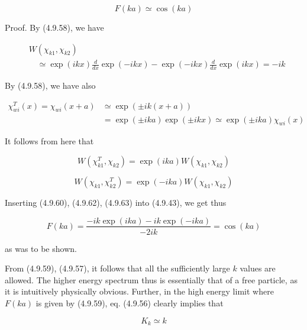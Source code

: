 \documentclass{article}
\begin{document}
\begin{equation*}
F(k a) \simeq \cos (k a) \tag{4.9.59}
\end{equation*}
 

Proof. By (4.9.58), we have
 
\begin{align*}
& W\left(\chi_{k 1}, \chi_{k 2}\right)  \tag{4.9.60}\\
& \quad \simeq \exp (i k x) \frac{d}{d x} \exp (-i k x)-\exp (-i k x) \frac{d}{d x} \exp (i k x)=-i k
\end{align*}
 

By (4.9.58), we have also
 
\begin{align*}
\chi_{w i}^{T}(x)=\chi_{w i}(x+a) & \simeq \exp ( \pm i k(x+a))  \tag{4.9.61}\\
& =\exp ( \pm i k a) \exp ( \pm i k x) \simeq \exp ( \pm i k a) \chi_{w i}(x)
\end{align*}
 

It follows from here that
 
\begin{equation*}
W\left(\chi_{k 1}^{T}, \chi_{k 2}\right)=\exp (i k a) W\left(\chi_{k 1}, \chi_{k 2}\right) \tag{4.9.62}
\end{equation*}
 
 
\begin{equation*}
W\left(\chi_{k 1}, \chi_{k 2}^{T}\right)=\exp (-i k a) W\left(\chi_{k 1}, \chi_{k 2}\right) \tag{4.9.63}
\end{equation*}
 

Inserting (4.9.60), (4.9.62), (4.9.63) into (4.9.43), we get thus
 
\begin{equation*}
F(k a)=\frac{-i k \exp (i k a)-i k \exp (-i k a)}{-2 i k}=\cos (k a) \tag{4.9.64}
\end{equation*}
 
as was to be shown.

From (4.9.59), (4.9.57), it follows that all the sufficiently large $k$ values are allowed. The higher energy spectrum thus is essentially that of a free particle, as it is intuitively physically obvious. Further, in the high energy limit where $F(k a)$ is given by (4.9.59), eq. (4.9.56) clearly implies that
 
\begin{equation*}
K_{k} \simeq k \tag{4.9.65}
\end{equation*}
 
\end{document}
